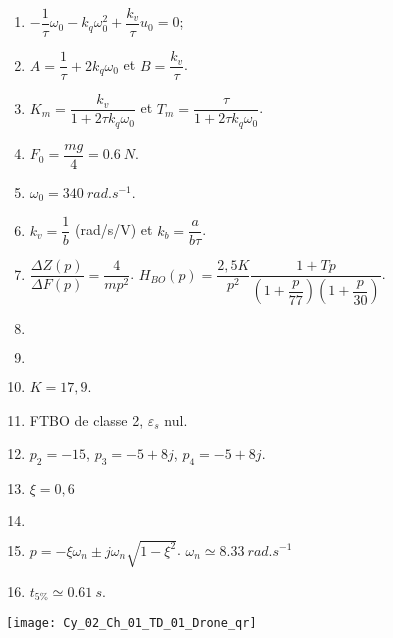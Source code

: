 \ifprof
\else
\begin{solution}
\begin{enumerate}
\item $-\dfrac{1}{\tau}\omega_0 - k_q \omega_0^2 + \dfrac{k_v}{\tau}u_0=0$;
\item $A=\dfrac{1}{\tau}+2k_q\omega_0$ et $B=\dfrac{k_v}{\tau}$.
\item $K_m=\dfrac{k_v}{1+2\tau k_q \omega_0}$ et $T_m=\dfrac{\tau}{1+2\tau k_q \omega_0}$.
\item $F_0=\dfrac{mg}{4}=\SI{0,6}{N}$.
\item $\omega_0=\SI{340}{rad.s^{-1}}$.
\item $k_v=\dfrac{1}{b}$ (rad/s/V) et $k_b=\dfrac{a}{b\tau}$.
\item $\dfrac{\Delta Z(p)}{\Delta F(p)}=\dfrac{4}{mp^2}$. $H_{BO}(p)=\dfrac{2,5 K}{p^2}\dfrac{1+Tp}{\left( 1+\dfrac{p}{77}\right)\left(1+\dfrac{p}{30} \right)}$.
\item  $\quad$
\item $\quad$
\item $K=17,9$.
\item FTBO  de classe 2, $\varepsilon_s$ nul.
\item $p_2=-15$, $p_3 = -5+8j$, $p_4=-5+8j$.
\item $\xi=0,6$
\item $\quad$
\item $p=-\xi\omega_n \pm j\omega_n \sqrt{1-\xi^2}$. $\omega_n\simeq \SI{8,33}{rad.s^{-1}}$
\item $t_{5\%}\simeq \SI{0,61}{ s}$. 
\end{enumerate}
\end{solution} 

\fi

\ifprof
\else
\begin{marginfigure}[-3cm]
\centering
\texttt{[image: Cy\_02\_Ch\_01\_TD\_01\_Drone\_qr]}
\end{marginfigure}
\fi
